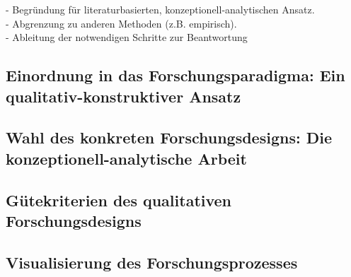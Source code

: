- Begründung für literaturbasierten, konzeptionell-analytischen Ansatz.\\


- Abgrenzung zu anderen Methoden (z.B. empirisch).\\
- Ableitung der notwendigen Schritte zur Beantwortung\\


\subsection{Einordnung in das Forschungsparadigma: Ein qualitativ-konstruktiver Ansatz}
\label{sec: 3.1.2}

\subsection{Wahl des konkreten Forschungsdesigns: Die konzeptionell-analytische Arbeit}
\label{sec: 3.1.3}

  \subsection{Gütekriterien des qualitativen Forschungsdesigns}
\label{sec: 3.1.4}

\subsection{Visualisierung des Forschungsprozesses}
\label{sec: 3.1.5}


